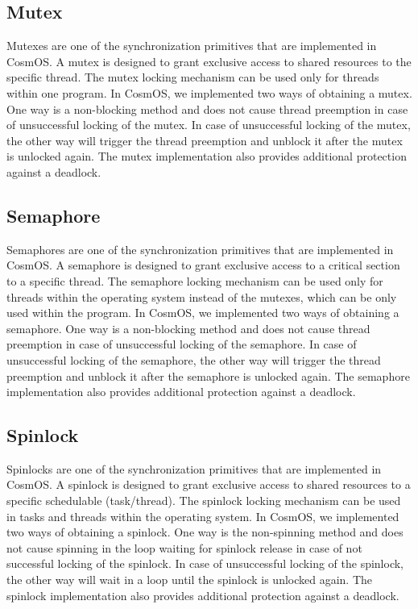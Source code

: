 \subsection{Mutex}
Mutexes are one of the synchronization primitives that are implemented in CosmOS. A mutex is designed to grant exclusive access to shared resources to the specific thread. The mutex locking mechanism can be used only for threads within one program. In CosmOS, we implemented two ways of obtaining a mutex. One way is a non-blocking method and does not cause thread preemption in case of unsuccessful locking of the mutex. In case of unsuccessful locking of the mutex, the other way will trigger the thread preemption and unblock it after the mutex is unlocked again. The mutex implementation also provides additional protection against a deadlock.

\subsection{Semaphore}
Semaphores are one of the synchronization primitives that are implemented in CosmOS. A semaphore is designed to grant exclusive access to a critical section to a specific thread. The semaphore locking mechanism can be used only for threads within the operating system instead of the mutexes, which can be only used within the program. In CosmOS, we implemented two ways of obtaining a semaphore. One way is a non-blocking method and does not cause thread preemption in case of unsuccessful locking of the semaphore. In case of unsuccessful locking of the semaphore, the other way will trigger the thread preemption and unblock it after the semaphore is unlocked again. The semaphore implementation also provides additional protection against a deadlock.

\subsection{Spinlock}
Spinlocks are one of the synchronization primitives that are implemented in CosmOS. A spinlock is designed to grant exclusive access to shared resources to a specific schedulable (task/thread). The spinlock locking mechanism can be used in tasks and threads within the operating system. In CosmOS, we implemented two ways of obtaining a spinlock. One way is the non-spinning method and does not cause spinning in the loop waiting for spinlock release in case of not successful locking of the spinlock. In case of unsuccessful locking of the spinlock, the other way will wait in a loop until the spinlock is unlocked again. The spinlock implementation also provides additional protection against a deadlock.

